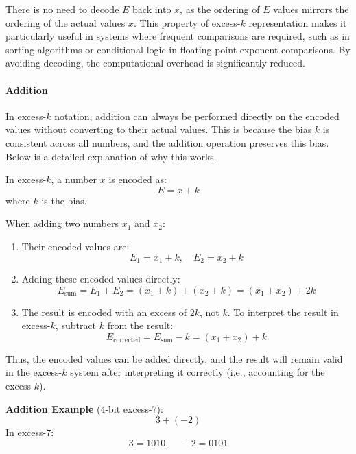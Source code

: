 There is no need to decode \( E \) back into \( x \), as the ordering of \( E \) values mirrors the ordering of the actual values \( x \). This property of excess-\( k \) representation makes it particularly useful in systems where frequent comparisons are required, such as in sorting algorithms or conditional logic in floating-point exponent comparisons. By avoiding decoding, the computational overhead is significantly reduced.

\paragraph{Addition}
In excess-\( k \) notation, addition can always be performed directly on the encoded values without converting to their actual values. This is because the bias \( k \) is consistent across all numbers, and the addition operation preserves this bias. Below is a detailed explanation of why this works.

In excess-\( k \), a number \( x \) is encoded as:
\[
E = x + k
\]
where \( k \) is the bias.

When adding two numbers \( x_1 \) and \( x_2 \):
\begin{enumerate}[left=1cm]
    \item Their encoded values are:
    \[
    E_1 = x_1 + k, \quad E_2 = x_2 + k
    \]
    \item Adding these encoded values directly:
    \[
    E_{\text{sum}} = E_1 + E_2 = (x_1 + k) + (x_2 + k) = (x_1 + x_2) + 2k
    \]
    \item The result is encoded with an excess of \( 2k \), not \( k \). To interpret the result in excess-\( k \), subtract \( k \) from the result:
    \[
    E_{\text{corrected}} = E_{\text{sum}} - k = (x_1 + x_2) + k
    \]
\end{enumerate}

Thus, the encoded values can be added directly, and the result will remain valid in the excess-\( k \) system after interpreting it correctly (i.e., accounting for the excess \( k \)).

 \vspace{\baselineskip}\par
\textbf{Addition Example} (4-bit excess-\( 7 \)):
\[
3 + (-2)
\]
In excess-\( 7 \):
\[
3 = 1010, \quad -2 = 0101
\]

